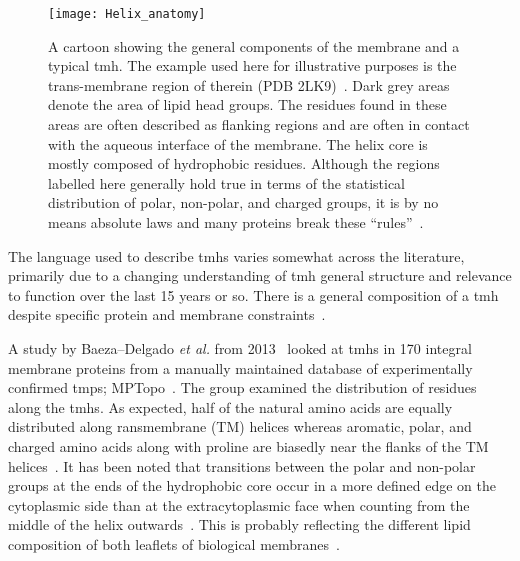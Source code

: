 \begin{figure}[!ht]
\centering
\texttt{[image: Helix\_anatomy]}
\caption{A cartoon showing the general components of the membrane and a typical \gls{tmh}. The example used here for illustrative purposes is the trans-membrane region of therein (PDB 2LK9)~\cite{Skasko2012}. Dark grey areas denote the area of lipid head groups. The residues found in these areas are often described as flanking regions and are often in contact with the aqueous interface of the membrane. The helix core is mostly composed of hydrophobic residues. Although the regions labelled here generally hold true in terms of the statistical distribution of polar, non-polar, and charged groups, it is by no means absolute laws and many proteins break these ``rules''~\cite{Sharpe2010, Baeza-Delgado2013, Pogozheva2013}. }
\label{fig:helixcartoon1}
\end{figure}




The language used to describe \gls{tmh}s varies somewhat across the literature, primarily due to a changing understanding of \gls{tmh} general structure and relevance to function over the last 15 years or so. There is a general composition of a \gls{tmh} despite specific protein and membrane constraints~\cite{Sharpe2010}.

A study by Baeza\---Delgado \textit{ et al.} from 2013~\cite{Baeza-Delgado2013} looked at \gls{tmh}s in 170 integral membrane proteins from a manually maintained database of experimentally confirmed \gls{tmp}s; MPTopo~\cite{Jayasinghe2001}. The group examined the distribution of residues along the \gls{tmh}s. As expected, half of the natural amino acids are equally distributed along ransmembrane (TM) helices whereas aromatic, polar, and charged amino acids along with proline are biasedly near the flanks of the TM helices~\cite{Baeza-Delgado2013}. It has been noted that transitions between the polar and non-polar groups at the ends of the hydrophobic core occur in a more defined edge on the cytoplasmic side than at the extracytoplasmic face when counting from the middle of the helix outwards~\cite{Baeza-Delgado2013}. This is probably reflecting the different lipid composition of both leaflets of biological membranes~\cite{Baeza-Delgado2013}.

